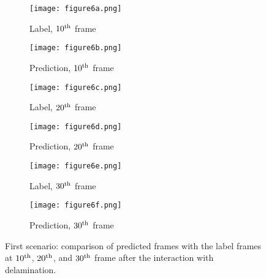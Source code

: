 \begin{figure} []
	\centering
	\begin{subfigure}[b]{0.44\textwidth}
		\centering
		\texttt{[image: figure6a.png]}
		\caption{Label, $10\textsuperscript{th}$ frame}
		\label{fig:num_415_label1}
	\end{subfigure}
	\hfill
	\begin{subfigure}[b]{0.44\textwidth}
		\centering
		\texttt{[image: figure6b.png]} 
		\caption{Prediction, $10\textsuperscript{th}$ frame}
		\label{fig:num_415_pred1}
	\end{subfigure}
	\hfill
	\begin{subfigure}[b]{0.44\textwidth}
		\centering
		\texttt{[image: figure6c.png]}
		\caption{Label, $20\textsuperscript{th}$ frame}
		\label{fig:num_415_label2}
	\end{subfigure}
	\hfill
	\begin{subfigure}[b]{0.44\textwidth}
		\centering
		\texttt{[image: figure6d.png]}
		\caption{Prediction, $20\textsuperscript{th}$ frame}
		\label{fig:num_415_pred2}
	\end{subfigure}
	\hfill
	\begin{subfigure}[b]{0.44\textwidth}
		\centering
		\texttt{[image: figure6e.png]}
		\caption{Label, $30\textsuperscript{th}$ frame}
		\label{fig:num_415_label3}
	\end{subfigure}
	\hfill	
	\begin{subfigure}[b]{0.44\textwidth}
		\centering
		\texttt{[image: figure6f.png]}
		\caption{Prediction, $30\textsuperscript{th}$ frame}
		\label{fig:num_415_pred3}
	\end{subfigure}
	\hfill	
	\caption{First scenario: comparison of predicted frames with the label 
		frames at $10\textsuperscript{th}$, $20\textsuperscript{th}$, and 
		$30\textsuperscript{th}$ frame after the interaction with delamination.}
	\label{fig:num_415}
\end{figure}
